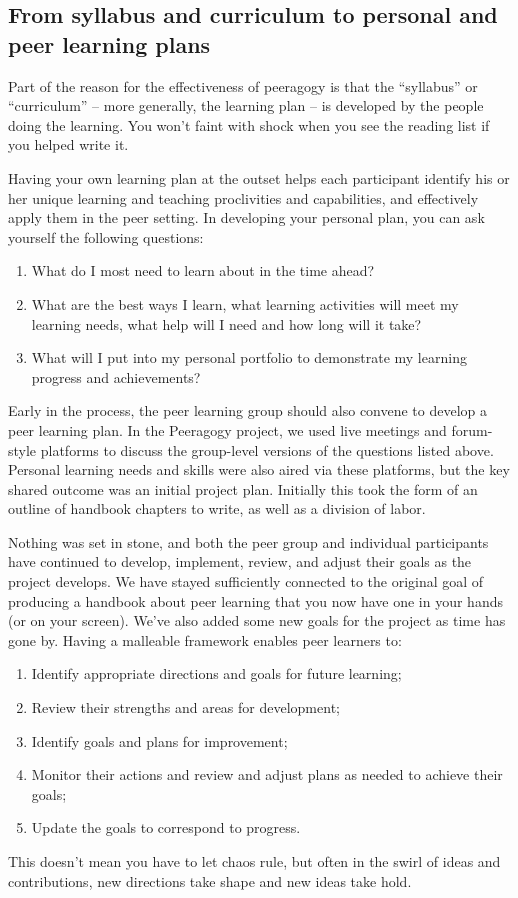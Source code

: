 \subsection{From syllabus and curriculum to personal and peer learning
plans}

Part of the reason for the effectiveness of peeragogy is that the
``syllabus'' or ``curriculum'' -- more generally, the learning plan --
is developed by the people doing the learning. You won't faint with
shock when you see the reading list if you helped write it.

Having your own learning plan at the outset helps each participant
identify his or her unique learning and teaching proclivities and
capabilities, and effectively apply them in the peer setting. In
developing your personal plan, you can ask yourself the following
questions:

\begin{enumerate}
\item
  What do I most need to learn about in the time ahead?
\item
  What are the best ways I learn, what learning activities will meet my
  learning needs, what help will I need and how long will it take?
\item
  What will I put into my personal portfolio to demonstrate my learning
  progress and achievements?
\end{enumerate}
Early in the process, the peer learning group should also convene to
develop a peer learning plan. In the Peeragogy project, we used live
meetings and forum-style platforms to discuss the group-level versions
of the questions listed above. Personal learning needs and skills were
also aired via these platforms, but the key shared outcome was an
initial project plan. Initially this took the form of an outline of
handbook chapters to write, as well as a division of labor.

Nothing was set in stone, and both the peer group and individual
participants have continued to develop, implement, review, and adjust
their goals as the project develops. We have stayed sufficiently
connected to the original goal of producing a handbook about peer
learning that you now have one in your hands (or on your screen). We've
also added some new goals for the project as time has gone by. Having a
malleable framework enables peer learners to:

\begin{enumerate}
\item
  Identify appropriate directions and goals for future learning;
\item
  Review their strengths and areas for development;
\item
  Identify goals and plans for improvement;
\item
  Monitor their actions and review and adjust plans as needed to achieve
  their goals;
\item
  Update the goals to correspond to progress.
\end{enumerate}
This doesn't mean you have to let chaos rule, but often in the swirl of
ideas and contributions, new directions take shape and new ideas take
hold.

